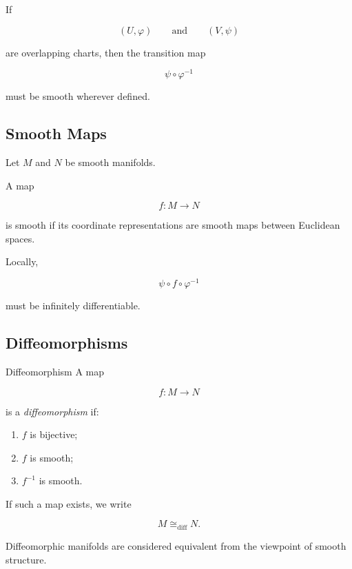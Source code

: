If

\[
(U,\varphi)
\qquad\text{and}\qquad
(V,\psi)
\]

are overlapping charts, then the transition map

\[
\boxed{
\psi\circ\varphi^{-1}
}
\]

must be smooth wherever defined.

\subsection{Smooth Maps}
\label{subsec:smooth-maps-differential-topology}

Let \(M\) and \(N\) be smooth manifolds.

A map

\[
f:M\to N
\]

is smooth if its coordinate representations are smooth maps between
Euclidean spaces.

Locally,

\[
\boxed{
\psi\circ f\circ\varphi^{-1}
}
\]

must be infinitely differentiable.

\subsection{Diffeomorphisms}
\label{subsec:diffeomorphisms-differential-topology}

\begin{definitionbox}{Diffeomorphism}
A map

\[
f:M\to N
\]

is a \emph{diffeomorphism} if:

\begin{enumerate}
    \item \(f\) is bijective;
    \item \(f\) is smooth;
    \item \(f^{-1}\) is smooth.
\end{enumerate}
\end{definitionbox}

If such a map exists, we write

\[
\boxed{
M\cong_{\mathrm{diff}}N.
}
\]

Diffeomorphic manifolds are considered equivalent from the viewpoint of
smooth structure.

